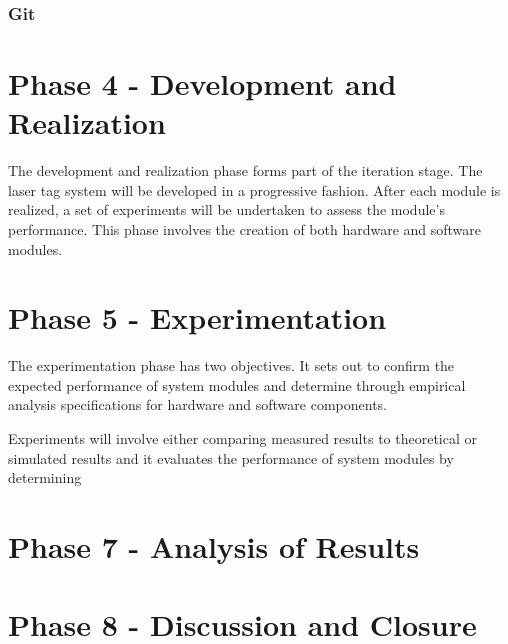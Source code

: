 \subsubsection{Git}




\section{Phase 4 - Development and Realization}

The development and realization phase forms part of the iteration stage. The laser tag system will be developed in a progressive fashion. After each module is realized, a set of experiments will be undertaken to assess the module's performance. This phase involves the creation of both hardware and software modules.

\section{Phase 5 - Experimentation}

The experimentation phase has two objectives. It sets out to confirm the expected performance of system modules and determine through empirical analysis specifications for hardware and software components.

Experiments will involve either comparing measured results to theoretical or simulated results and it evaluates the performance of system modules by determining 



\section{Phase 7 - Analysis of Results}



\section{Phase 8 - Discussion and Closure}








